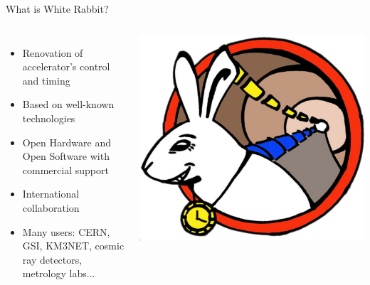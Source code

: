 \documentclass[compress,red]{beamer}
\begin{document}
\begin{frame}{What is White Rabbit?}

\begin{columns}[c]
	  \begin{itemize}
		\item Renovation of accelerator's control and timing
		\item Based on well-known technologies
		\item Open Hardware and Open Software with commercial support
		\item International collaboration
    \item Many users: CERN, GSI, KM3NET, cosmic ray detectors, metrology labs...
	  \end{itemize}
		\begin{center}
		\includegraphics[width=1.0\textwidth]{logo/WRlogo.pdf}
		\end{center}
	\end{columns}
\end{frame}
\end{document}
